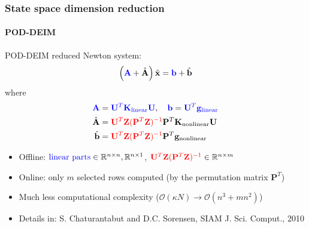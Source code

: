 \documentclass{beamer}
\begin{document}
\begin{frame}
  \frametitle{State space dimension reduction}
  \framesubtitle{POD-DEIM}

  \begin{block}{POD-DEIM reduced Newton system:}
    \[
      \left(\textcolor{blue}{\mathbf{A}}
      + \hat{\mathbf{A}}\right) \tilde{\mathbf{x}}
      = \textcolor{blue}{\mathbf{b}}
      + \hat{\mathbf{b}}
    \]
    where
    \begin{align*}
      \textcolor{blue}{\mathbf{A}} &=
      \textcolor{blue}
      {
      \mathbf{U}^T
      \mathbf{K}_\text{linear}
      \mathbf{U}
      },
      \quad
      \textcolor{blue}{\mathbf{b}} =
      \textcolor{blue}{
      \mathbf{U}^T \mathbf{g}_\text{linear} }
      \\
      \hat{\mathbf{A}} &=
      \textcolor{red}{
      \mathbf{U}^T
      \mathbf{Z} (\mathbf{P}^T \mathbf{Z})^{-1}
      }
      \mathbf{P}^T
      \mathbf{K}_\text{nonlinear}
      \mathbf{U}
      \\
      \hat{\mathbf{b}} &=
      \textcolor{red}{
     \mathbf{U}^T \mathbf{Z} (\mathbf{P}^T \mathbf{Z})^{-1}
      }
     \mathbf{P}^T
      \mathbf{g}_\text{nonlinear}
    \end{align*}
  \end{block}

  \vspace{0.3cm}

  \begin{itemize}
    \item Offline: $\textcolor{blue}{\text{linear parts}} \in \mathbb{R}^{n
      \times n}, \mathbb{R}^{n \times 1}$, $\textcolor{red}{\mathbf{U}^T \mathbf{Z} (\mathbf{P}^T
    \mathbf{Z})^{-1}} \in \mathbb{R}^{n \times m}$
  \item Online: only $m$ selected rows computed (by the permutation matrix $\mathbf{P}^T$)
  \item Much less computational complexity ($\mathcal{O}(\kappa N)
    \rightarrow \mathcal{O}(n^3 + mn^2)$)
  \end{itemize}

  \begin{itemize}
    \item[] \scriptsize{Details in: S. Chaturantabut and D.C. Sorensen, SIAM J.
      Sci. Comput., 2010}
  \end{itemize}

\end{frame}
\end{document}

